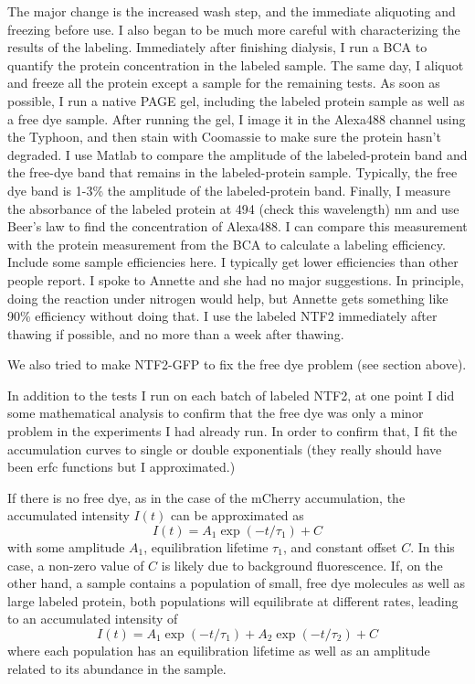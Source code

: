 The major change is the increased wash step, and the immediate aliquoting and freezing before use.  I also began to be much more careful with characterizing the results of the labeling.  Immediately after finishing dialysis, I run a BCA to quantify the protein concentration in the labeled sample.  The same day, I aliquot and freeze all the protein except a sample for the remaining tests.  As soon as possible, I run a native PAGE gel, including the labeled protein sample as well as a free dye sample.  After running the gel, I image it in the Alexa488 channel using the Typhoon, and then stain with Coomassie to make sure the protein hasn't degraded.  I use Matlab to compare the amplitude of the labeled-protein band and the free-dye band that remains in the labeled-protein sample.  Typically, the free dye band is 1-3\% the amplitude of the labeled-protein band.  Finally, I measure the absorbance of the labeled protein at 494 (check this wavelength) nm and use Beer's law to find the concentration of Alexa488.  I can compare this measurement with the protein measurement from the BCA to calculate a labeling efficiency.  Include some sample efficiencies here.  I typically get lower efficiencies than other people report.  I spoke to Annette and she had no major suggestions.  In principle, doing the reaction under nitrogen would help, but Annette gets something like 90\% efficiency without doing that.  I use the labeled NTF2 immediately after thawing if possible, and no more than a week after thawing.

We also tried to make NTF2-GFP to fix the free dye problem (see section above).

In addition to the tests I run on each batch of labeled NTF2, at one point I did some mathematical analysis to confirm that the free dye was only a minor problem in the experiments I had already run.  In order to confirm that, I fit the accumulation curves to single or double exponentials (they really should have been erfc functions but I approximated.)

If there is no free dye, as in the case of the mCherry accumulation, the accumulated intensity $I(t)$ can be approximated as
\begin{equation}
I(t) = A_1\exp(-t/\tau_1) +C
\label{eq:single-exp}
\end{equation}
with some amplitude $A_1$, equilibration lifetime $\tau_1$, and constant offset $C$.  In this case, a non-zero value of $C$ is likely due to background fluorescence.  If, on the other hand, a sample contains a population of small, free dye molecules as well as large labeled protein, both populations will equilibrate at different rates, leading to an accumulated intensity of
\begin{equation}
I(t) = A_1\exp(-t/\tau_1) + A_2\exp(-t/\tau_2)+C
\label{eq:double-exp}
\end{equation}
where each population has an equilibration lifetime as well as an amplitude related to its abundance in the sample.

